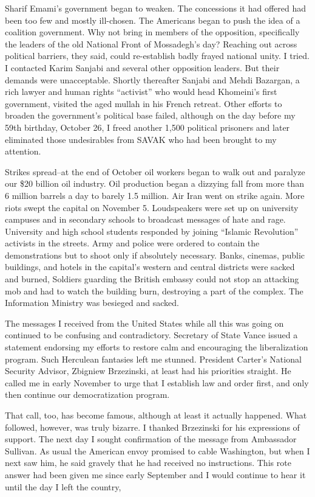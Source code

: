 Sharif Emami's government began to weaken. The concessions it had offered had been too few and mostly ill-chosen. The Americans began to push the idea of a coalition government. Why not bring in members of the opposition, specifically the leaders of the old National Front of Mossadegh’s day? Reaching out across political barriers, they said, could re-establish badly frayed national unity. I tried. I contacted Karim Sanjabi and several other opposition leaders. But their demands were unacceptable. Shortly thereafter Sanjabi and Mehdi Bazargan, a rich lawyer and human rights “activist” who would head Khomeini’s first government, visited the aged mullah in his French retreat. Other efforts to broaden the government's political base failed, although on the day before my 59th birthday, October 26, I freed another 1,500 political prisoners and later eliminated those undesirables from SAVAK who had been brought to my attention. 

Strikes spread--at the end of October oil workers began to walk out and paralyze our \$20 billion oil industry. Oil production began a dizzying fall from more than 6 million barrels a day to barely 1.5 million. Air Iran went on strike again. More riots swept the capital on November 5. Loudspeakers were set up on university campuses and in secondary schools to broadcast messages of hate and rage. University and high school students responded by joining “Islamic Revolution” activists in the streets. Army and police were ordered to contain the demonstrations but to shoot only if absolutely necessary. Banks, cinemas, public buildings, and hotels in the capital's western and central districts were sacked and burned, Soldiers guarding the British embassy could not stop an attacking mob and had to watch the building burn, destroying a part of the complex. The Information Ministry was besieged and sacked. 

The messages I received from the United States while all this was going on continued to be confusing and contradictory. Secretary of State Vance issued a statement endorsing my efforts to restore calm and encouraging the liberalization program. Such Herculean fantasies left me stunned. President Carter's National Security Advisor, Zbigniew Brzezinski, at least had his priorities straight. He called me in early November to urge that I establish law and order first, and only then continue our democratization program. 

That call, too, has become famous, although at least it actually happened. What followed, however, was truly bizarre. I thanked Brzezinski for his expressions of support. The next day I sought confirmation of the message from Ambassador Sullivan. As usual the American envoy promised to cable Washington, but when I next saw him, he said gravely that he had received no instructions. This rote answer had been given me since early September and I would continue to hear it until the day I left the country, 

